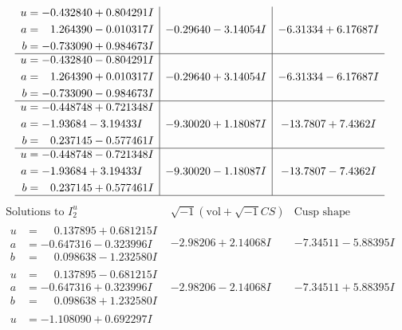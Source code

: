 \documentclass[1p]{elsarticle_modified}
\theoremstyle{definition}
\newcommand{\I}{\sqrt{-1}}
\begin{document}
$$\begin{array}{c|c|c}
\begin{aligned}
u &= -0.432840 + 0.804291 I \\
a &= \phantom{-}1.264390 - 0.010317 I \\
b &= -0.733090 + 0.984673 I\end{aligned}
 & -0.29640 - 3.14054 I & -6.31334 + 6.17687 I \\ \hline\begin{aligned}
u &= -0.432840 - 0.804291 I \\
a &= \phantom{-}1.264390 + 0.010317 I \\
b &= -0.733090 - 0.984673 I\end{aligned}
 & -0.29640 + 3.14054 I & -6.31334 - 6.17687 I \\ \hline\begin{aligned}
u &= -0.448748 + 0.721348 I \\
a &= -1.93684 - 3.19433 I \\
b &= \phantom{-}0.237145 - 0.577461 I\end{aligned}
 & -9.30020 + 1.18087 I & -13.7807 + 7.4362 I \\ \hline\begin{aligned}
u &= -0.448748 - 0.721348 I \\
a &= -1.93684 + 3.19433 I \\
b &= \phantom{-}0.237145 + 0.577461 I\end{aligned}
 & -9.30020 - 1.18087 I & -13.7807 - 7.4362 I\\
 \hline 
 \end{array}$$\newpage$$\begin{array}{c|c|c}  
\text{Solutions to }I^u_{2}& \I (\text{vol} + \sqrt{-1}CS) & \text{Cusp shape}\\
 \hline 
\begin{aligned}
u &= \phantom{-}0.137895 + 0.681215 I \\
a &= -0.647316 - 0.323996 I \\
b &= \phantom{-}0.098638 - 1.232580 I\end{aligned}
 & -2.98206 + 2.14068 I & -7.34511 - 5.88395 I \\ \hline\begin{aligned}
u &= \phantom{-}0.137895 - 0.681215 I \\
a &= -0.647316 + 0.323996 I \\
b &= \phantom{-}0.098638 + 1.232580 I\end{aligned}
 & -2.98206 - 2.14068 I & -7.34511 + 5.88395 I \\ \hline\begin{aligned}
u &= -1.108090 + 0.692297 I \\

\end{aligned}
\end{array}$$
\end{document}
